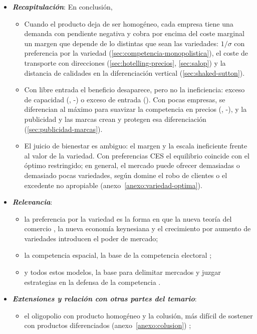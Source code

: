 \documentclass[11pt]{article}
\begin{document}
\begin{itemize}
\item \textbf{\emph{Recapitulación}}: En conclusión,
  \begin{itemize}
  \item Cuando el producto deja de ser homogéneo, cada empresa tiene una demanda con pendiente negativa y cobra por encima del coste marginal un margen que depende de lo distintas que sean las variedades: $1/\sigma$ con preferencia por la variedad (\ref{sec:competencia-monopolistica}), el coste de transporte con direcciones (\ref{sec:hotelling-precios}, \ref{sec:salop}) y la distancia de calidades en la diferenciación vertical (\ref{sec:shaked-sutton}).
  \item Con libre entrada el beneficio desaparece, pero no la ineficiencia: exceso de capacidad (, -) o exceso de entrada (). Con pocas empresas, se diferencian al máximo para suavizar la competencia en precios (, -), y la publicidad y las marcas crean y protegen esa diferenciación (\ref{sec:publicidad-marcas}).
  \item El juicio de bienestar es ambiguo: el margen y la escala ineficiente frente al valor de la variedad. Con preferencias CES el equilibrio coincide con el óptimo restringido; en general, el mercado puede ofrecer demasiadas o demasiado pocas variedades, según domine el robo de clientes o el excedente no apropiable (anexo~\ref{anexo:variedad-optima}).
  \end{itemize}
\item \textbf{\emph{Relevancia}}:
  \begin{itemize}
  \item la preferencia por la variedad es la forma en que la nueva teoría del comercio , la nueva economía keynesiana  y el crecimiento por aumento de variedades  introducen el poder de mercado;
  \item la competencia espacial, la base de la competencia electoral ;
  \item y todos estos modelos, la base para delimitar mercados y juzgar estrategias en la defensa de la competencia  .
  \end{itemize}
\item \textbf{\emph{Extensiones y relación con otras partes del temario}}:
  \begin{itemize}
  \item el oligopolio con producto homogéneo y la colusión, más difícil de sostener con productos diferenciados (anexo~\ref{anexo:colusion}) ;

\end{itemize}
\end{itemize}
\end{document}
